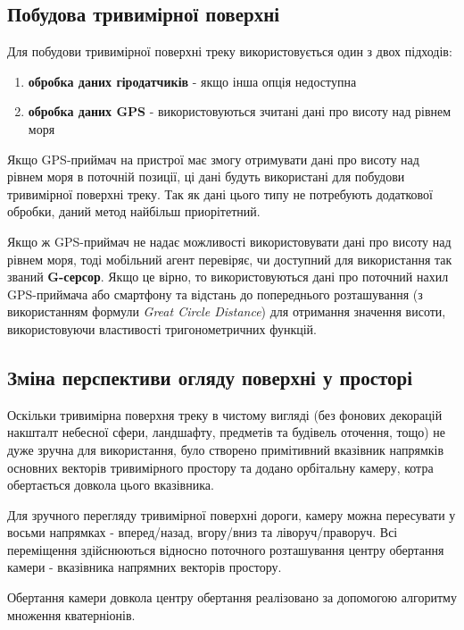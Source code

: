 \documentclass[simple,a4paper,14pt,ukrainian,utf8]{eskdtext}
\begin{document}
    \subsection{Побудова тривимірної поверхні}
    
    Для побудови тривимірної поверхні треку використовується один з двох підходів:
    
    \begin{enumerate}
    	\item \textbf{обробка даних гіродатчиків} - якщо інша опція недоступна
    	\item \textbf{обробка даних GPS} - використовуються зчитані дані про висоту над рівнем моря
    \end{enumerate}
    
    Якщо GPS-приймач на пристрої має змогу отримувати дані про висоту над рівнем моря в поточній позиції, ці дані будуть використані для побудови тривимірної поверхні треку. Так як дані цього типу не потребують додаткової обробки, даний метод найбільш приорітетний.
    
    Якщо ж GPS-приймач не надає можливості використовувати дані про висоту над рівнем моря, тоді мобільний агент перевіряє, чи доступний для використання так званий \textbf{G-серсор}. Якщо це вірно, то використовуються дані про поточний нахил GPS-приймача або смартфону та відстань до попереднього розташування (з використанням формули \textit{Great Circle Distance}) для отримання значення висоти, використовуючи властивості тригонометричних функцій.
    
    \subsection{Зміна перспективи огляду поверхні у просторі}
    
    Оскільки тривимірна поверхня треку в чистому вигляді (без фонових декорацій накшталт небесної сфери, ландшафту, предметів та будівель оточення, тощо) не дуже зручна для використання, було створено примітивний вказівник напрямків основних векторів тривимірного простору та додано орбітальну камеру, котра обертається довкола цього вказівника.
    
    Для зручного перегляду тривимірної поверхні дороги, камеру можна пересувати у восьми напрямках - вперед/назад, вгору/вниз та ліворуч/праворуч. Всі переміщення здійснюються відносно поточного розташування центру обертання камери - вказівника напрямних векторів простору.
    
    Обертання камери довкола центру обертання реалізовано за допомогою алгоритму множення кватерніонів.
    
\end{document}
